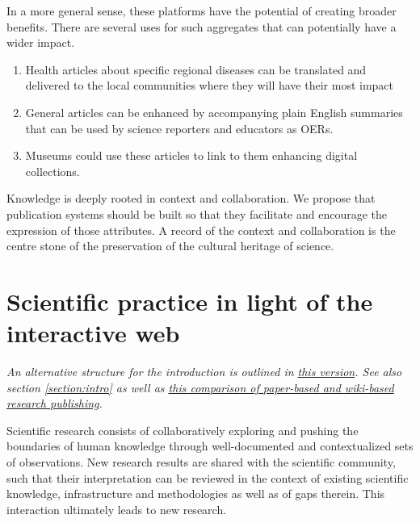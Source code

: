\documentclass[final,authoryear,3p]{elsarticle-open-drafting}
\begin{document}
In a more general sense, these platforms have the potential of creating broader benefits. There are several uses for such aggregates that can potentially have a wider impact. 

\begin{enumerate}
\item Health articles about specific regional diseases can be translated and delivered to the local communities where they will have their most impact
\item General articles can be enhanced by accompanying plain English summaries that can be used by science reporters and educators as OERs. 
\item Museums could use these articles to link to them enhancing digital collections. 
\end{enumerate}

Knowledge is deeply rooted in context and collaboration. We propose that publication systems should be built so that they facilitate and encourage the expression of those attributes. A record of the context and collaboration is the centre stone of the preservation of the cultural heritage of science. 




\section{Scientific practice in light of the interactive web}
\label{section:intro2}
{\it An alternative structure for the introduction is outlined in \href{https://github.com/Daniel-Mietchen/Open-Research-Proposals/blob/1c101eb017c9bcb2a8ec72932eff36085bf64590/open-drafting.tex}{this version}. See also section \ref{section:intro} as well as \href{http://en.wikiversity.org/wiki/Wikis_in_scholarly_communication#Comparison_between_paper-based_and_wiki-based_scholarly_communication_systems}{this comparison of paper-based and wiki-based research publishing}.}

Scientific research consists of collaboratively exploring and pushing the boundaries of human knowledge through 
well-documented and contextualized sets of observations. New research results are shared with the scientific 
community, such that their interpretation can be reviewed in the context of existing scientific knowledge, infrastructure 
and methodologies as well as of gaps therein. This interaction ultimately leads to new research. 
\end{document}
